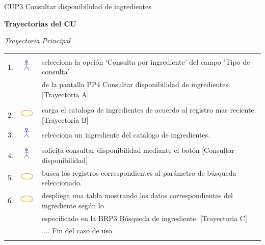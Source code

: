 \documentclass[10pt,spanish]{article}
\providecommand{\tabularnewline}{\\}
\begin{document}
\begin{table}[!ht]
	\caption{CUP3 Consultar disponibilidad de ingredientes}
	\label{tab:CasosdeUso:nombredecasodeuso} 
	\end{table}
	\newpage
	\textbf{\large Trayectorias del CU}{\large \par}
	\textit{\large Trayectoria Principal}{\large{} }{\large \par}
	\begin{tabular}{ccl}
	 &  & \tabularnewline
	1. & \includegraphics{actor} & selecciona la opción ‘Consulta por ingrediente’ del campo 'Tipo de consulta' \tabularnewline
	& &  de la pantalla PP4 Consultar disponibilidad de ingredientes. [Trayectoria A]\tabularnewline
\tabularnewline
	2. & \includegraphics{sistema} &  carga el catalogo de ingredientes de acuerdo al registro mas reciente.[Trayectoria B]\tabularnewline
	3. & \includegraphics{actor} &  selecciona un ingrediente del catalogo de ingredientes.\tabularnewline
	4. & \includegraphics{actor} & solicita consultar disponibilidad mediante el botón [Consultar disponibilidad]\tabularnewline 
	5. & \includegraphics{sistema} & busca los registros correspondientes al parámetro de búsqueda seleccionado. \tabularnewline
	6. & \includegraphics{sistema} & despliega una tabla mostrando los datos correspondientes del ingrediente según lo\tabularnewline
	& & especificado en la BRP3 Búsqueda de ingrediente. [Trayectoria C]\tabularnewline
	 &  & .... Fin del caso de uso\tabularnewline \\
	\end{tabular}
\end{document}
